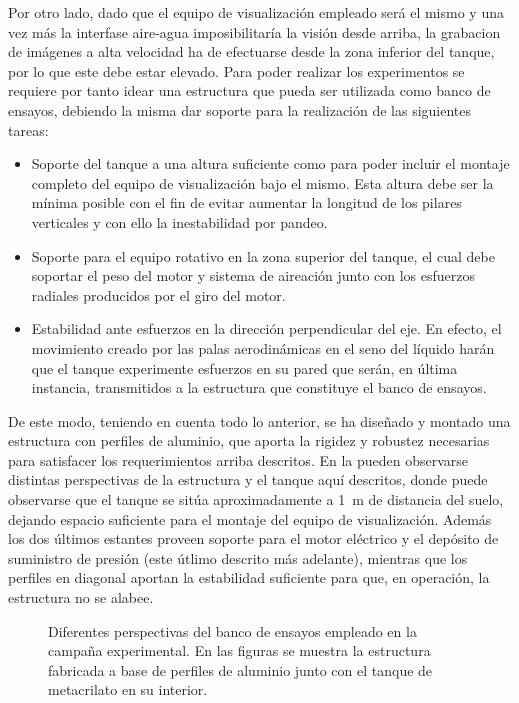 Por otro lado, dado que el equipo de visualización empleado será el mismo y una vez más la interfase aire-agua imposibilitaría la visión desde arriba, la grabacion de imágenes a alta velocidad ha de efectuarse desde la zona inferior del tanque, por lo que este debe estar elevado. Para poder realizar los experimentos se requiere por tanto idear una estructura que pueda ser utilizada como banco de ensayos, debiendo la misma dar soporte para la realización de las siguientes tareas:

\begin{itemize}
\item Soporte del tanque a una altura suficiente como para poder incluir el montaje completo del equipo de visualización bajo el mismo. Esta altura debe ser la mínima posible con el fin de evitar aumentar la longitud de los pilares verticales y con ello la inestabilidad por pandeo.
\item Soporte para el equipo rotativo en la zona superior del tanque, el cual debe soportar el peso del motor y sistema de aireación junto con los esfuerzos radiales producidos por el giro del motor. 
\item Estabilidad ante esfuerzos en la dirección perpendicular del eje. En efecto, el movimiento creado por las palas aerodinámicas en el seno del líquido harán que el tanque experimente esfuerzos en su pared que serán, en última instancia, transmitidos a la estructura que constituye el banco de ensayos. 
\end{itemize}

De este modo, teniendo en cuenta todo lo anterior, se ha diseñado y montado una estructura con perfiles de aluminio, que aporta la rigidez y robustez necesarias para satisfacer los requerimientos arriba descritos. En la  pueden observarse distintas perspectivas de la estructura y el tanque aquí descritos, donde puede observarse que el tanque se sitúa aproximadamente a 1~m de distancia del suelo, dejando espacio suficiente para el montaje del equipo de visualización. Además los dos últimos estantes proveen soporte para el motor eléctrico y el depósito de suministro de presión (este útlimo descrito más adelante), mientras que los perfiles en diagonal aportan la estabilidad suficiente para que, en operación, la estructura no se alabee. 

\begin{figure}
\centering
{}
\caption{Diferentes perspectivas del banco de ensayos empleado en la campaña experimental. En las figuras se muestra la estructura fabricada a base de perfiles de aluminio junto con el tanque de metacrilato en su interior.}
\end{figure}


